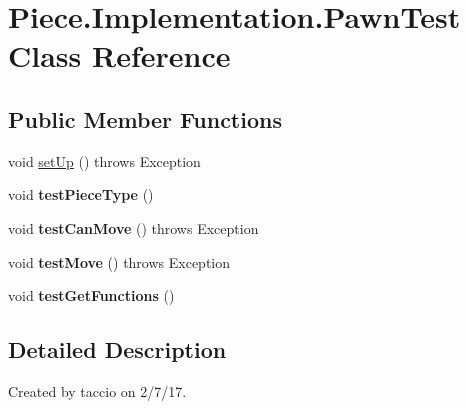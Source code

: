 \hypertarget{classPiece_1_1Implementation_1_1PawnTest}{\section{Piece.\-Implementation.\-Pawn\-Test Class Reference}
\label{classPiece_1_1Implementation_1_1PawnTest}
}
\subsection*{Public Member Functions}
\begin{DoxyCompactItemize}
\item 
void \hyperlink{classPiece_1_1Implementation_1_1PawnTest_ae274f39090097cc60c4f861bf2fe1a22}{set\-Up} ()  throws Exception 
\item 
\hypertarget{classPiece_1_1Implementation_1_1PawnTest_a6ecd01eb2d9f9eb6d97d17652a519582}{void {\bfseries test\-Piece\-Type} ()}\label{classPiece_1_1Implementation_1_1PawnTest_a6ecd01eb2d9f9eb6d97d17652a519582}

\item 
\hypertarget{classPiece_1_1Implementation_1_1PawnTest_a19660e5dff24a52ff4951218aafd3202}{void {\bfseries test\-Can\-Move} ()  throws Exception}\label{classPiece_1_1Implementation_1_1PawnTest_a19660e5dff24a52ff4951218aafd3202}

\item 
\hypertarget{classPiece_1_1Implementation_1_1PawnTest_a09de68d6a36f556f619649962a8900be}{void {\bfseries test\-Move} ()  throws Exception}\label{classPiece_1_1Implementation_1_1PawnTest_a09de68d6a36f556f619649962a8900be}

\item 
\hypertarget{classPiece_1_1Implementation_1_1PawnTest_ab8772a206d20ae1b400a913c36d615e9}{void {\bfseries test\-Get\-Functions} ()}\label{classPiece_1_1Implementation_1_1PawnTest_ab8772a206d20ae1b400a913c36d615e9}

\end{DoxyCompactItemize}


\subsection{Detailed Description}
Created by taccio on 2/7/17. 

